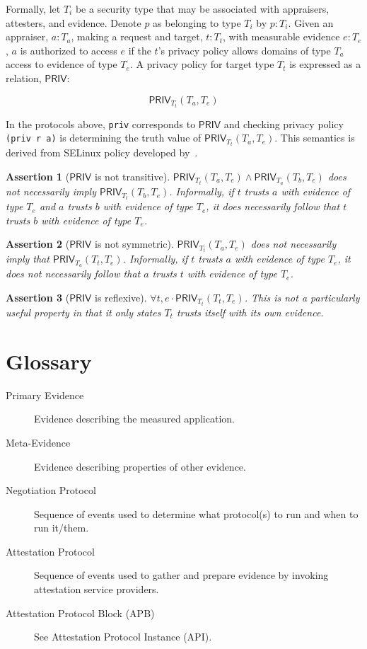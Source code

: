 \documentclass[10pt]{article}
\newtheorem{assertion}{Assertion}
\begin{document}
Formally, let $T_i$ be a security type that may be associated with
appraisers, attesters, and evidence.  Denote $p$ as
belonging to type $T_i$ by $p:T_i$.  Given an appraiser, $a:T_a$,
making a request and target, $t:T_t$, with measurable evidence
$e:T_e$, $a$ is authorized to access $e$ if the $t$'s privacy policy
allows domains of type $T_a$ access to evidence of type $T_e$. A
privacy policy for target type $T_t$ is expressed as a relation,
$\mathsf{PRIV}$:

\[\mathsf{PRIV}_{T_t}(T_a,T_e)\]

In the protocols above, \Verb+priv+ corresponds to $\mathsf{PRIV}$ and
checking privacy policy \Verb+(priv r a)+ is determining the truth
value of $\mathsf{PRIV}_{T_t}(T_a,T_e)$.  This semantics is derived
from SELinux policy developed by~\citet{Hicks:07:A-logical-speci}.

\begin{assertion}[$\mathsf{PRIV}$ is not transitive]
  $\mathsf{PRIV}_{T_t}(T_a,T_e)\wedge\mathsf{PRIV}_{T_a}(T_b,T_e)$
  does not necessarily imply $\mathsf{PRIV}_{T_t}(T_b,T_e)$.
  Informally, if $t$ trusts $a$ with evidence of type $T_e$ and $a$
  trusts $b$ with evidence of type $T_e$, it does necessarily follow
  that $t$ trusts $b$ with evidence of type $T_e$.
\end{assertion}

\begin{assertion}[$\mathsf{PRIV}$ is not symmetric]
  $\mathsf{PRIV}_{T_t}(T_a,T_e)$ does not necessarily imply that
  $\mathsf{PRIV}_{T_a}(T_t,T_e)$.  Informally, if $t$ trusts $a$ with
  evidence of type $T_e$, it does not necessarily follow that $a$
  trusts $t$ with evidence of type $T_e$.
\end{assertion}

\begin{assertion}[$\mathsf{PRIV}$ is reflexive]
  $\forall t,e\cdot\mathsf{PRIV}_{T_t}(T_t,T_e)$. This is not a
  particularly useful property in that it only states $T_t$ trusts
  itself with its own evidence.
\end{assertion}

\appendix

\section*{Glossary}

\begin{description}
\item[Primary Evidence] Evidence describing the measured application.
\item[Meta-Evidence] Evidence describing properties of other evidence.
\item[Negotiation Protocol] Sequence of events used to determine what
  protocol(s) to run and when to run it/them.
\item[Attestation Protocol] Sequence of events used to gather and
  prepare evidence by invoking attestation service providers.
\item[Attestation Protocol Block (APB)] See Attestation Protocol
  Instance (API).
\end{description}
\end{document}
